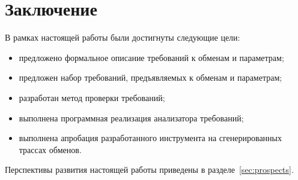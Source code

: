 \section{Заключение}

В рамках настоящей работы были достигнуты следующие цели:

\begin{itemize}
 \item предложено формальное описание требований к обменам и параметрам;
 \item предложен набор требований, предъявляемых к обменам и параметрам;
 \item разработан метод проверки требований;
 \item выполнена программная реализация анализатора требований;
 \item выполнена апробация разработанного инструмента на сгенерированных 
трассах обменов.
\end{itemize}

Перспективы развития настоящей работы приведены в разделе~\ref{sec:prospects}.

